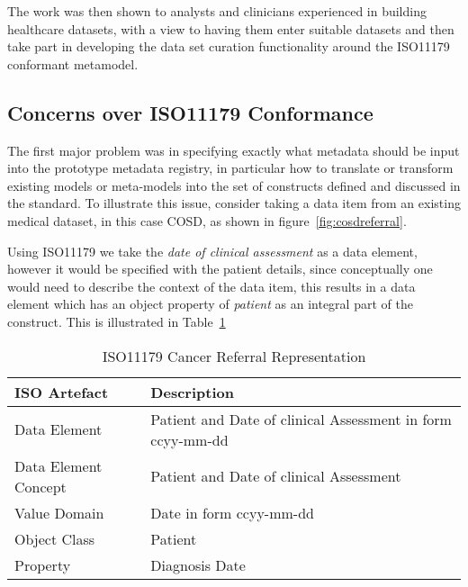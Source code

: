 \documentclass[runningheads]{llncs}
\begin{document}
	The work was then shown to analysts and clinicians experienced in building healthcare datasets, with a view to having them enter suitable datasets and then take part in developing the data set curation functionality around the ISO11179 conformant metamodel.
	
	\subsection{Concerns over ISO11179 Conformance}
	The first major problem was in specifying exactly what metadata should be input into the prototype metadata registry, in particular how to translate or transform existing models or meta-models into the set of constructs defined and discussed in the standard. To illustrate this issue, consider taking a data item from an existing medical dataset, in this case COSD, as shown in figure~\ref{fig:cosdreferral}.
	
	
	Using ISO11179 we take the \emph{date of clinical assessment} as a data element, however it would be specified with the patient details, since conceptually one would need to describe the context of the data item, this results in a data element which has an object property of \emph{patient} as an integral part of the construct. This is illustrated in Table~\ref{tab:isoobjects}
	\begin{table}[h]
		\begin{center}
			\caption{ISO11179 Cancer Referral Representation}
			\label{tab:isoobjects}
			\begin{tabular}{ p{2cm} | p{4cm}  } 
				\textbf{ISO Artefact} & \textbf{Description} \\
				\hline
				Data Element & Patient and Date of clinical Assessment in form ccyy-mm-dd  \\ 
				\hline
				Data Element Concept & Patient and Date of clinical Assessment  \\ 
				\hline
				Value Domain & Date in form ccyy-mm-dd \\ 
				\hline
				Object Class & Patient\\
				\hline
				Property& Diagnosis Date \\
			\end{tabular}
		\end{center}
	\end{table}
	
\end{document}
